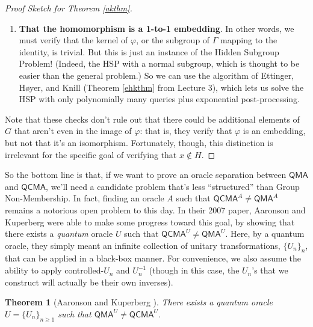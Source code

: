\documentclass[12pt]{report}
\theoremstyle{plain}
\newtheorem{theorem}{Theorem}[section]
\theoremstyle{definition}
\begin{document}
\begin{proof}[Proof Sketch for Theorem \ref{akthm}]
\begin{enumerate}
    \item   \textbf{That the homomorphism is a 1-to-1 embedding}.  In other words, we must verify that the kernel of $\varphi$, or the subgroup of $\Gamma$ mapping to the identity, is trivial.  But this is just an instance of the Hidden Subgroup Problem!  (Indeed, the HSP with a normal subgroup, which is thought to be easier than the general problem.)  So
        we can use the algorithm of Ettinger, H\o yer, and Knill \cite{ehk} (Theorem \ref{ehkthm} from Lecture 3), which lets us solve the HSP with only polynomially many queries plus exponential post-processing.
  \end{enumerate}
  Note that these checks don't rule out that there could be additional elements of $G$ that aren't even in the image of $\varphi$: that is, they verify that $\varphi$ is an embedding, but not that it's an isomorphism.  Fortunately, though, this distinction is irrelevant for the specific goal of verifying that $x\not\in H$.
\end{proof}

So the bottom line is that, if we want to prove an oracle separation between $\mathsf{QMA}$ and $\mathsf{QCMA}$, we'll need a candidate problem that's less ``structured'' than Group Non-Membership.  In fact, finding an oracle $A$ such that $\mathsf{QCMA}^A \neq \mathsf{QMA}^A$ remains a notorious open problem to this day.  In their 2007 paper, Aaronson and Kuperberg \cite{ak} were able to make some progress toward this goal, by showing that there exists a {\em quantum} oracle $U$ such that $\mathsf{QCMA}^U \neq \mathsf{QMA}^U$.  Here, by a quantum oracle, they simply meant an infinite collection of unitary transformations, $\{U_n \}_n$, that can be applied in a black-box manner.  For convenience, we also assume the ability to apply controlled-$U_n$ and $U_n^{-1}$ (though in this case, the $U_n$'s that we construct will actually be their own inverses).

\begin{theorem}[Aaronson and Kuperberg \cite{ak}]
\label{akthm2}
  There exists a quantum oracle $U = \{ U_n \}_{n \geq 1}$ such that $\mathsf{QMA}^U
  \neq \mathsf{QCMA}^U$.
\end{theorem}
\end{document}
